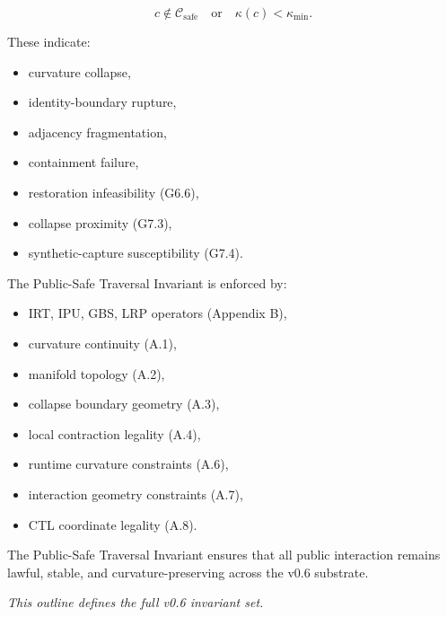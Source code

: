 \[
c \notin \mathcal{C}_{\mathrm{safe}}
\quad \text{or} \quad
\kappa(c) < \kappa_{\min}.
\]



These indicate:
\begin{itemize}
    \item curvature collapse,
    \item identity-boundary rupture,
    \item adjacency fragmentation,
    \item containment failure,
    \item restoration infeasibility (G6.6),
    \item collapse proximity (G7.3),
    \item synthetic-capture susceptibility (G7.4).
\end{itemize}

\medskip

\noindent The Public-Safe Traversal Invariant is enforced by:
\begin{itemize}
    \item IRT, IPU, GBS, LRP operators (Appendix B),
    \item curvature continuity (A.1),
    \item manifold topology (A.2),
    \item collapse boundary geometry (A.3),
    \item local contraction legality (A.4),
    \item runtime curvature constraints (A.6),
    \item interaction geometry constraints (A.7),
    \item CTL coordinate legality (A.8).
\end{itemize}

\medskip

\noindent The Public-Safe Traversal Invariant ensures that all public interaction
remains lawful, stable, and curvature-preserving across the v0.6 substrate.


\medskip
\noindent\textit{This outline defines the full v0.6 invariant set.}
